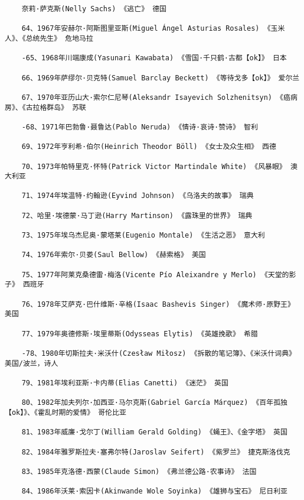 \documentclass[UTF8]{../RepresentationUniverse}
\begin{document}
\begin{lstlisting}
    奈莉·萨克斯(Nelly Sachs) 《逃亡》 德国
    
    64、1967年安赫尔·阿斯图里亚斯(Miguel Ángel Asturias Rosales) 《玉米人》、《总统先生》 危地马拉
    
    -65、1968年川端康成(Yasunari Kawabata) 《雪国·千只鹤·古都【ok】》 日本
    
    66、1969年萨缪尔·贝克特(Samuel Barclay Beckett) 《等待戈多【ok】》 爱尔兰
    
    67、1970年亚历山大·索尔仁尼琴(Aleksandr Isayevich Solzhenitsyn) 《癌病房》、《古拉格群岛》 苏联
    
    -68、1971年巴勃鲁·聂鲁达(Pablo Neruda) 《情诗·哀诗·赞诗》 智利
    
    69、1972年亨利希·伯尔(Heinrich Theodor Böll) 《女士及众生相》 西德
    
    70、1973年帕特里克·怀特(Patrick Victor Martindale White) 《风暴眼》 澳大利亚
    
    71、1974年埃温特·约翰逊(Eyvind Johnson) 《乌洛夫的故事》 瑞典
    
    72、哈里·埃德蒙·马丁逊(Harry Martinson) 《露珠里的世界》 瑞典
    
    73、1975年埃乌杰尼奥·蒙塔莱(Eugenio Montale) 《生活之恶》 意大利
    
    74、1976年索尔·贝娄(Saul Bellow) 《赫索格》 美国
    
    75、1977年阿莱克桑德雷·梅洛(Vicente Pío Aleixandre y Merlo) 《天堂的影子》 西班牙
    
    76、1978年艾萨克·巴什维斯·辛格(Isaac Bashevis Singer) 《魔术师·原野王》 美国
    
    77、1979年奥德修斯·埃里蒂斯(Odysseas Elytis) 《英雄挽歌》 希腊
    
    -78、1980年切斯拉夫·米沃什(Czesław Miłosz) 《拆散的笔记簿》、《米沃什词典》 美国/波兰，诗人
    
    79、1981年埃利亚斯·卡内蒂(Elias Canetti) 《迷茫》 英国
    
    80、1982年加夫列尔·加西亚·马尔克斯(Gabriel García Márquez) 《百年孤独【ok】》、《霍乱时期的爱情》 哥伦比亚
    
    81、1983年威廉·戈尔丁(William Gerald Golding) 《蝇王》、《金字塔》 英国
    
    82、1984年雅罗斯拉夫·塞弗尔特(Jaroslav Seifert) 《紫罗兰》 捷克斯洛伐克
    
    83、1985年克洛德·西蒙(Claude Simon) 《弗兰德公路·农事诗》 法国
    
    84、1986年沃莱·索因卡(Akinwande Wole Soyinka) 《雄狮与宝石》 尼日利亚
    

\end{lstlisting}
\end{document}

